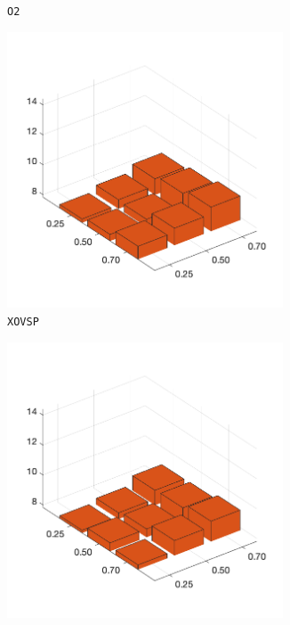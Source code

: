 \begin{figure}[H]
\begin{subfigure}[b]{0.25\textwidth}
		\caption{\texttt{O2}}
		\label{fig:x}
    	\end{subfigure}
%
	\begin{subfigure}[b]{0.25\textwidth}
		\centering
		\includegraphics[width=0.9\textwidth]{crossover/min/cross_sp_2.png}
		\caption{\texttt{XOVSP}}
		\label{fig:y}
    	\end{subfigure}
%
	\begin{subfigure}[b]{0.25\textwidth}
		\centering
		\includegraphics[width=0.9\textwidth]{crossover/min/cross_partial_map_2.png}

\end{subfigure}
\end{figure}
